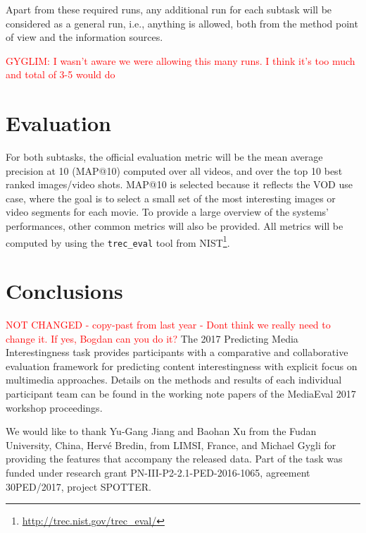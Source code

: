 \documentclass[sigconf]{acmart-me}
\begin{document}
Apart from these required runs, any additional run for each subtask will be considered as a general run, i.e., anything is allowed, both from the method point of view and the information sources. 

\textcolor{red}{GYGLIM: I wasn't aware we were allowing this many runs. I think it's too much and total of 3-5 would do}
\section{Evaluation}

For both subtasks, the official evaluation metric will be the mean average precision at 10 (MAP@10) computed over all videos, and over the top 10 best ranked images/video shots. MAP@10 is selected because it reflects the VOD use case, where the goal is to select a small set of the most interesting images or video segments for each movie. To provide a large overview of the systems' performances, other common metrics will also be provided. All metrics will be computed by using the \texttt{trec\_eval} tool from
NIST\footnote{\url{http://trec.nist.gov/trec\_eval/}}.

\section{Conclusions}
\textcolor{red}{NOT CHANGED - copy-past from last year - Dont think we really need to change it. If yes, Bogdan can you do it?}
The 2017 Predicting Media Interestingness task provides participants
with a comparative and collaborative evaluation framework for
predicting content interestingness with explicit focus on
multimedia approaches. Details on the methods and results of each individual
participant team can be found in the working note papers of the
MediaEval 2017 workshop proceedings.

\begin{acks}
We would like to thank Yu-Gang Jiang and Baohan Xu
from the Fudan University, China, Herv\'{e} Bredin, from LIMSI,
France, and Michael Gygli for providing the features that accompany the
released data. Part of the task was funded under research grant PN-III-P2-2.1-PED-2016-1065, agreement 30PED/2017, project SPOTTER.
\end{acks}



\def\bibfont{\small} %

\end{document}
